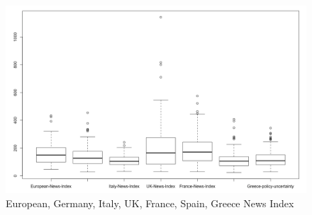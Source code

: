 \documentclass[12pt]{article}
\begin{document}
\begin{figure}
  \centering 
  \includegraphics[width=\linewidth]{Uncertainty.png}
  \caption{European, Germany, Italy, UK, France, Spain, Greece News Index}
  \label{fig:policy_uncertainty}
\end{figure}
\end{document}
